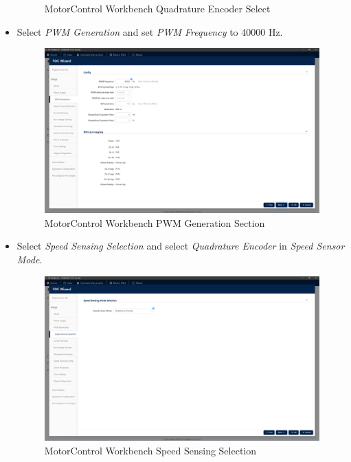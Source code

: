 \documentclass[10pt]{article}
\begin{document}
\begin{itemize}
\begin{figure}[H]
                        \caption{MotorControl Workbench Quadrature Encoder Select}
                    \end{figure}
                \item Select \emph{PWM Generation} and set \emph{PWM Frequency} to 40000 Hz.
                    \begin{figure}[H]
                        \centerline{\includegraphics[width=\textwidth]{References/MCW FOC PWM Gen.png}}
                        \caption{MotorControl Workbench PWM Generation Section}
                    \end{figure}
                \item Select \emph{Speed Sensing Selection} and select \emph{Quadrature Encoder} in \emph{Speed Sensor Mode}.
                    \begin{figure}[H]
                        \centerline{\includegraphics[width=\textwidth]{References/MCW FOC QEI Speed Sensing.png}}
                        \caption{MotorControl Workbench Speed Sensing Selection}
                    \end{figure}

\end{itemize}
\end{document}
